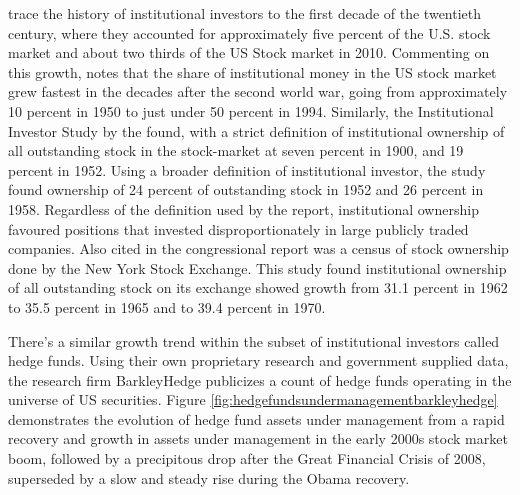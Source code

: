 \cite{Blume2012} trace the history of institutional investors to the first decade of the twentieth century, where they accounted for approximately five percent of the U.S. stock market and about two thirds of the US Stock market in 2010.  Commenting on this growth, \cite{friedmaneconomic1996} notes that the share of institutional money in the US stock market grew fastest in the decades after the second world war, going from approximately 10 percent in 1950 to just under 50 percent in 1994. Similarly, the Institutional Investor Study by the \cite{U.S.SecuritiesandExchangeCommission1971} found, with a strict definition of institutional ownership of all outstanding stock in the stock-market at seven percent in 1900, and 19 percent in 1952.  Using a broader definition of institutional investor, the study found ownership of 24 percent of outstanding stock in 1952 and 26 percent in 1958.  Regardless of the definition used by the report, institutional ownership favoured positions that invested disproportionately in large publicly traded companies.  Also cited in the congressional report was a census of stock ownership done by the New York Stock Exchange.  This study found institutional ownership of all outstanding stock on its exchange showed growth from 31.1 percent in 1962 to 35.5 percent in 1965 and to 39.4 percent in 1970. 
	
There's a similar growth trend within the subset of institutional investors called hedge funds.  Using their own proprietary research and government supplied data, the research firm BarkleyHedge publicizes a count of hedge funds operating in the universe of US securities.  Figure \ref{fig:hedgefundsundermanagementbarkleyhedge} demonstrates the evolution of hedge fund assets under management from a rapid recovery and growth in assets under management in the early 2000s stock market boom, followed by a precipitous drop after the Great Financial Crisis of 2008, superseded by a slow and steady rise during the Obama recovery.  

